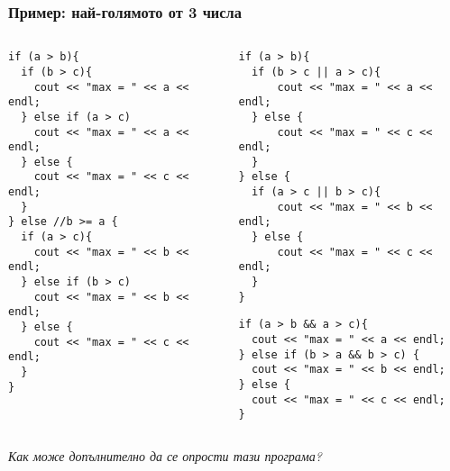 \documentclass{beamer}
\begin{document}
\begin{frame}[fragile]
\frametitle{Пример: най-голямото от 3 числа}


\begin{columns}[t]
  \begin{column}{0.3\textwidth}
\begin{lstlisting}
if (a > b){
  if (b > c){
    cout << "max = " << a << endl;
  } else if (a > c)
    cout << "max = " << a << endl;
  } else {
    cout << "max = " << c << endl;
  }
} else //b >= a {
  if (a > c){
    cout << "max = " << b << endl;
  } else if (b > c)
    cout << "max = " << b << endl;
  } else {
    cout << "max = " << c << endl;
  }
}

\end{lstlisting}

  \end{column}

\pause
  \begin{column}{0.3\textwidth}
\begin{lstlisting}
if (a > b){
  if (b > c || a > c){
      cout << "max = " << a << endl;
  } else {
      cout << "max = " << c << endl;
  }
} else {
  if (a > c || b > c){
      cout << "max = " << b << endl;
  } else {
      cout << "max = " << c << endl;
  }
}
\end{lstlisting}

\pause

\begin{lstlisting}
if (a > b && a > c){
  cout << "max = " << a << endl;
} else if (b > a && b > c) {
  cout << "max = " << b << endl;
} else {
  cout << "max = " << c << endl;
}
\end{lstlisting}
  \end{column}
\end{columns}

\emph{Как може допълнително да се опрости тази програма?}

\end{frame}
\end{document}
